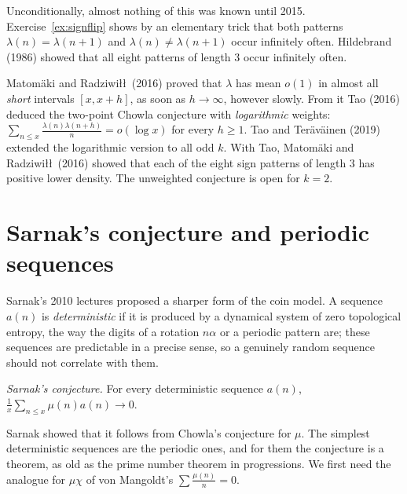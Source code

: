 Unconditionally, almost nothing of this was known until 2015. Exercise~\ref{ex:signflip} shows by an elementary trick that both patterns $\lambda(n)=\lambda(n+1)$
and $\lambda(n)\ne\lambda(n+1)$ occur infinitely often. Hildebrand (1986) showed that all eight patterns of length $3$ occur infinitely often.

\begin{remark}\label{rem:chowlaprogress}
Matom\"aki and Radziwi\l\l\ (2016) proved that $\lambda$ has mean $o(1)$ in almost all \emph{short} intervals $[x,x+h]$, as soon as $h\to\infty$, however
slowly. From it Tao (2016) deduced the two-point Chowla conjecture with \emph{logarithmic} weights: $\sum_{n\le x}\frac{\lambda(n)\lambda(n+h)}n=o(\log x)$
for every $h\ge1$. Tao and Ter\"av\"ainen (2019) extended the logarithmic version to all odd $k$. With Tao, Matom\"aki and Radziwi\l\l\ (2016) showed that each
of the eight sign patterns of length $3$ has positive lower density. The unweighted conjecture is open for $k=2$.
\end{remark}

\section{Sarnak's conjecture and periodic sequences}

Sarnak's 2010 lectures proposed a sharper form of the coin model. A sequence $a(n)$ is \emph{deterministic} if it is produced by a dynamical system of
zero topological entropy, the way the digits of a rotation $n\alpha$ or a periodic pattern are; these sequences are predictable in a precise sense, so a
genuinely random sequence should not correlate with them.

\begin{center}
\emph{Sarnak's conjecture.} For every deterministic sequence $a(n)$, $\frac1x\sum_{n\le x}\mu(n)a(n)\to0$.
\end{center}

Sarnak showed that it follows from Chowla's conjecture for $\mu$. The simplest deterministic sequences are the periodic ones, and for them the conjecture is
a theorem, as old as the prime number theorem in progressions. We first need the analogue for $\mu\chi$ of von Mangoldt's $\sum\frac{\mu(n)}n=0$.

